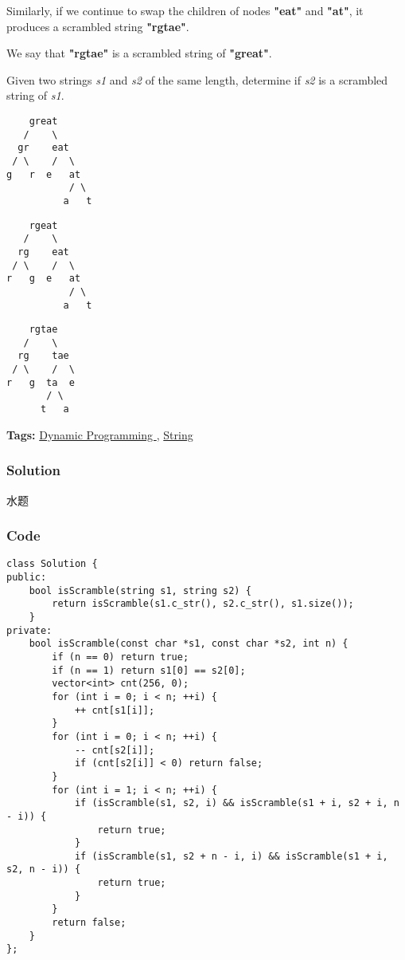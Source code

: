 \documentclass{article}
\begin{document}
\begin{CJK*}{UTF8}{gkai}
Similarly, if we continue to swap the children of nodes \textbf{"eat"} and \textbf{"at"}, it produces a scrambled string \textbf{"rgtae"}.

We say that \textbf{"rgtae"} is a scrambled string of \textbf{"great"}.

Given two strings \emph{s1} and \emph{s2} of the same length, determine if \emph{s2} is a scrambled string of \emph{s1}.

\begin{verbatim}
    great
   /    \
  gr    eat
 / \    /  \
g   r  e   at
           / \
          a   t
\end{verbatim}
\begin{verbatim}
    rgeat
   /    \
  rg    eat
 / \    /  \
r   g  e   at
           / \
          a   t
\end{verbatim}
\begin{verbatim}
    rgtae
   /    \
  rg    tae
 / \    /  \
r   g  ta  e
       / \
      t   a
\end{verbatim}

\textbf{Tags: }
\hyperref[ Dynamic Programming ]{ Dynamic Programming },  \hyperref[ String ]{ String }



\subsubsection*{Solution}
水题

\subsubsection*{Code}
\begin{lstlisting}
class Solution {
public:
    bool isScramble(string s1, string s2) {
        return isScramble(s1.c_str(), s2.c_str(), s1.size());
    }
private:
    bool isScramble(const char *s1, const char *s2, int n) {
        if (n == 0) return true;
        if (n == 1) return s1[0] == s2[0];
        vector<int> cnt(256, 0);
        for (int i = 0; i < n; ++i) {
            ++ cnt[s1[i]];
        }
        for (int i = 0; i < n; ++i) {
            -- cnt[s2[i]];
            if (cnt[s2[i]] < 0) return false;
        }
        for (int i = 1; i < n; ++i) {
            if (isScramble(s1, s2, i) && isScramble(s1 + i, s2 + i, n - i)) {
                return true;
            }
            if (isScramble(s1, s2 + n - i, i) && isScramble(s1 + i, s2, n - i)) {
                return true;
            }
        }
        return false;
    }
};


\end{lstlisting}
\end{CJK*}
\end{document}

